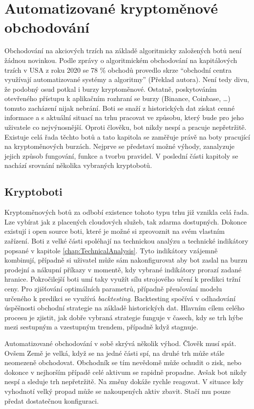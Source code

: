 \chapter{Automatizované kryptoměnové obchodování}
\label{chap:Cryptobots}
Obchodování na akciových trzích na základě algoritmicky založených botů není žádnou novinkou. Podle zprávy o algoritmickém obchodování na kapitálových trzích v USA z roku 2020 %
se 78 \% obchodů provedlo skrze \enquote{obchodní centra využívají automatizované systémy a algoritmy} (Překlad autora). Není tedy divu, že podobný osud potkal i burzy
kryptoměnové. Ostatně, poskytováním otevřeného přístupu k aplikačním rozhraní se burzy (Binance, Coinbase, \ldots) tomuto zacházení nijak nebrání. Boti se snaží z historických
dat získat cenné informace a s aktuální situací na trhu pracovat ve způsobu, který bude pro jeho uživatele co nejvýnosnější. Oproti člověku, bot nikdy nespí a pracuje
nepřetržitě. Existuje celá řada těchto botů a tato kapitola se zaměřuje právě na boty pracující na kryptoměnových burzách. Nejprve se představí možné výhody,
zanalyzuje jejich způsob fungování, funkce a tvorbu pravidel. V poslední části kapitoly se nachází srovnání několika vybraných kryptobotů.

\section{Kryptoboti}
Kryptoměnových botů za odbobí existence tohoto typu trhu již vznikla celá řada. Lze vybírat jak z placených cloudových služeb, tak zdarma dostupných. Dokonce existují i open
source boti, které je možné si zprovoznit na svém vlastním zařízení. Boti z velké části spoléhají na technickou analýzu a technické indikátory popsané v kapitole \ref{chap:TechnicalAnalysis}.
Tyto indikátory vzájemně kombinují, případně si uživatel může sám nakonfigurovat aby bot zaslal na burzu prodejní a nákupní příkazy v momentě, kdy vybrané indikátory
prorazí zadané hranice. Pokročilejší boti umí taky využít sílu strojového učení k predikci tržní ceny. Pro zjišťování optimálních parametrů, případně přeučování modelu
určeného k predikci se využívá \emph{backtesting}. Backtesting spočívá v odhadování úspěšnosti obchodní strategie na základě historických dat. Hlavním cílem celého procesu
je zjistit, jak dobře vybraná strategie funguje v časech, kdy se trh hýbe mezi sestupným a vzestupným trendem, případně když stagnuje.

Automatizované obchodování v sobě skrývá několik výhod. Člověk musí spát. Ovšem Země je velká, když se na jedné části spí, na druhé trh může stále neomezeně obchodovat.
Obchodník se tím nevědomě může ochudit o zisk, nebo dokonce v nejhorším případě celé aktivum se rapidně propadne. Avšak bot nikdy nespí a sleduje trh nepřetržitě. Na změny
dokáže rychle reagovat. V situace kdy vyhodnotí velký propad může se nakoupených aktiv zbavit. Stačí mu pouze předat dostatečnou konfiguraci.

